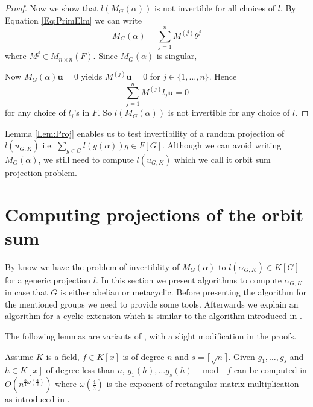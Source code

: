 \documentclass[sigconf]{acmart}
\newcommand{\osum}[2]{\alpha_{#1,#2}}
\theoremstyle{acmplain}
\begin{document}
\begin{proof}
 
 Now we show that $l(M_G(\alpha))$ is not invertible for all
 choices of $l$. By Equation \ref{Eq:PrimElm} we can write 
 $$M_G(\alpha) = \sum_{j = 1}^n M^{(j)} \theta^j$$ 
 where $M^{j} \in M_{n \times n}(F)$. Since $M_G(\alpha)$ is singular, 
 
 Now $M_G(\alpha) \textbf{u} =0$ yields $M^{(j)}\textbf{u} = 0$ for $j \in \lbrace 1, \ldots , n \rbrace$. Hence
 $$\sum_{j = 1}^n M^{(j)} l_j \textbf{u} = 0$$ for any choice of $l_j$'s in $F$. So $l(M_G(\alpha))$ is not invertible for any choice of $l$.
\end{proof} 
Lemma \ref{Lem:Proj} enables us to test invertibility of a random projection of $l(u_{G,K}) $ i.e. $\sum_{g \in G}
 l(g(\alpha))g \in F[G]$. Although we can avoid writing $M_G(\alpha)$, we still need to compute $l(u_{G,K})$ which
 we call it orbit sum projection problem.


\section{Computing projections of the orbit sum}

By know we have the problem of invertiblity of $M_G(\alpha)$ to $l(\osum{G}{K}) \in K[G]$ for a generic
projection $l$. In this section we present algorithms to compute $\alpha_{G,K}$ in case that $G$ is either abelian or metacyclic. 
Before presenting the algorithm for the mentioned groups we need to provide some tools. Afterwards we explain an algorithm
for a cyclic extension which is similar to the algorithm introduced in \cite{Kaltofen}.

The following lemmas are variants of \cite[Lemma 3 $\&$ Lemma 4]{Kaltofen}, with a slight modification in the proofs.

\begin{lemma}\cite{Kaltofen}\label{modcom}
Assume $K$ is a field, $f\in K[x]$ is of degree $n$ and $s = \lceil\sqrt{n}\rceil$. Given $g_1, \ldots , g_{s}$ and 
$h \in K[x]$ of degree less than $n$, $g_1(h), \ldots g_{s}(h)\,\,\,\mod\,\,\, f$ can be computed in
$O(n^{\frac{3}{4}\omega(\frac{4}{3})})$ where $\omega(\frac{4}{3})$ is the exponent of rectangular matrix 
multiplication as introduced in \cite{LeGall}. 
\end{lemma}
\end{document}
